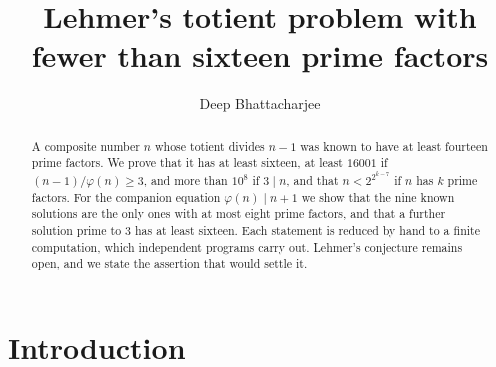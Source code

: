 \documentclass[11pt,reqno]{amsart}
\title[Lehmer's totient problem]
{Lehmer's totient problem with fewer than sixteen prime factors}
\author{Deep Bhattacharjee}
\date{}
\numberwithin{equation}{section}
\theoremstyle{plain}
\theoremstyle{definition}
\theoremstyle{remark}
\begin{document}
\begin{abstract}
A composite number $n$ whose totient divides $n-1$ was known to have at
least fourteen prime factors. We prove that it has at least sixteen,
at least $16001$ if $(n-1)/\varphi(n)\ge3$, and more than $10^8$ if
$3\mid n$, and that $n<2^{2^{k-7}}$ if $n$ has $k$ prime factors. For
the companion equation $\varphi(n)\mid n+1$ we show that the nine known
solutions are the only ones with at most eight prime factors, and that
a further solution prime to $3$ has at least sixteen. Each
statement is reduced by hand to a finite computation, which independent
programs carry out. Lehmer's conjecture remains open, and we state the
assertion that would settle it.
\end{abstract}

\maketitle

\section{Introduction}\label{sec:intro}
\end{document}
